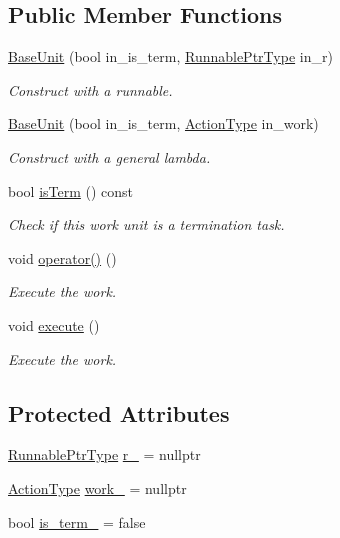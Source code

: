 \subsection*{Public Member Functions}
\begin{DoxyCompactItemize}
\item 
\hyperlink{structvt_1_1sched_1_1_base_unit_a4223dce0bcccbb989eb49106d2e37abe}{Base\+Unit} (bool in\+\_\+is\+\_\+term, \hyperlink{structvt_1_1sched_1_1_base_unit_a9be5d5adaeb011c8ef82f751485ebf9a}{Runnable\+Ptr\+Type} in\+\_\+r)
\begin{DoxyCompactList}\small\item\em Construct with a runnable. \end{DoxyCompactList}\item 
\hyperlink{structvt_1_1sched_1_1_base_unit_a46072cff720f9dbcf7a1af4f9794ba90}{Base\+Unit} (bool in\+\_\+is\+\_\+term, \hyperlink{namespacevt_ae0a5a7b18cc99d7b732cb4d44f46b0f3}{Action\+Type} in\+\_\+work)
\begin{DoxyCompactList}\small\item\em Construct with a general lambda. \end{DoxyCompactList}\item 
bool \hyperlink{structvt_1_1sched_1_1_base_unit_a18e4bf669d499be8e9443011bf9c6b02}{is\+Term} () const
\begin{DoxyCompactList}\small\item\em Check if this work unit is a termination task. \end{DoxyCompactList}\item 
void \hyperlink{structvt_1_1sched_1_1_base_unit_accbb274436789b6b8ed99c3ee42a8114}{operator()} ()
\begin{DoxyCompactList}\small\item\em Execute the work. \end{DoxyCompactList}\item 
void \hyperlink{structvt_1_1sched_1_1_base_unit_aba3a1772f8a5efb922656dfba6434136}{execute} ()
\begin{DoxyCompactList}\small\item\em Execute the work. \end{DoxyCompactList}\end{DoxyCompactItemize}
\subsection*{Protected Attributes}
\begin{DoxyCompactItemize}
\item 
\hyperlink{structvt_1_1sched_1_1_base_unit_a9be5d5adaeb011c8ef82f751485ebf9a}{Runnable\+Ptr\+Type} \hyperlink{structvt_1_1sched_1_1_base_unit_a0d126796f0ee5a8e0f3304e6ca02d0fc}{r\+\_\+} = nullptr
\item 
\hyperlink{namespacevt_ae0a5a7b18cc99d7b732cb4d44f46b0f3}{Action\+Type} \hyperlink{structvt_1_1sched_1_1_base_unit_ab425435c3b6c1cdf2fc208f1e50ea84c}{work\+\_\+} = nullptr
\item 
bool \hyperlink{structvt_1_1sched_1_1_base_unit_a5aab7332c91c6ccdc76bdb55de9cc502}{is\+\_\+term\+\_\+} = false
\end{DoxyCompactItemize}



